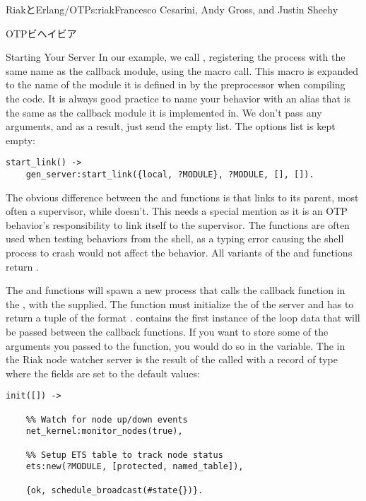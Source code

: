 \begin{aosachapter}{RiakとErlang/OTP}{s:riak}{Francesco Cesarini, Andy Gross, and Justin Sheehy}
\begin{aosasect1}{OTPビヘイビア}
\begin{aosasect2}{Starting Your Server}
In our example, we call , registering the process
with the same name as the callback module, using the 
macro call. This macro is expanded to the name of the module it is
defined in by the preprocessor when compiling the code. It is always
good practice to name your behavior with an alias that is the same as
the callback module it is implemented in. We don't pass any arguments,
and as a result, just send the empty list. The options list is kept
empty:

\begin{verbatim}
start_link() ->
    gen_server:start_link({local, ?MODULE}, ?MODULE, [], []).
\end{verbatim}

\noindent The obvious difference between the  and 
functions is that  links to its parent, most often a
supervisor, while  doesn't. This needs a special mention
as it is an OTP behavior's responsibility to link itself to the
supervisor. The  functions are often used when testing
behaviors from the shell, as a typing error causing the shell process
to crash would not affect the behavior. All variants of the
 and  functions return .

The  and  functions will spawn a new
process that calls the  callback function in the
, with the  supplied. The
 function must initialize the  of the server
and has to return a tuple of the format .  contains the first instance of the loop
data that will be passed between the callback functions. If you want
to store some of the arguments you passed to the  function, you
would do so in the  variable. The  in
the Riak node watcher server is the result of the
 called with a record of type 
where the fields are set to the default values:

\begin{verbatim}
init([]) ->

    %% Watch for node up/down events
    net_kernel:monitor_nodes(true),

    %% Setup ETS table to track node status
    ets:new(?MODULE, [protected, named_table]),

    {ok, schedule_broadcast(#state{})}.
\end{verbatim}


\end{aosasect2}
\end{aosasect1}
\end{aosachapter}
